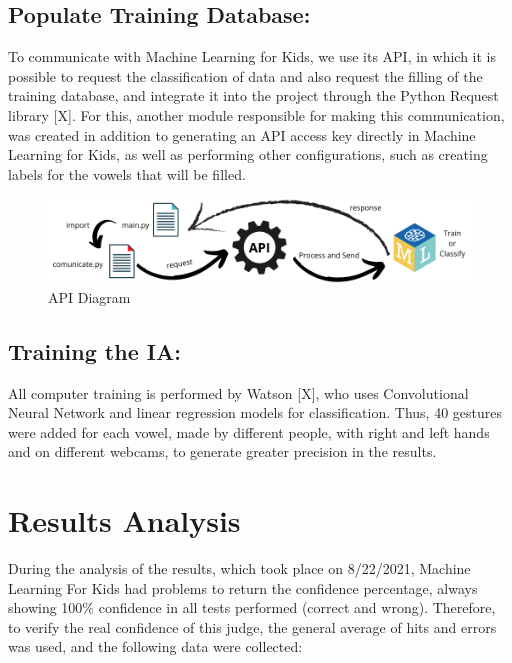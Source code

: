 \documentclass[a4paper, 12pt]{article}
\begin{document}
\subsection{Populate Training Database:}
To communicate with Machine Learning for Kids, we use its API, in which it is possible to request the classification of data and also request the filling of the training database, and integrate it into the project through the Python Request library [X]. For this, another module responsible for making this communication, was created in addition to generating an API access key directly in Machine Learning for Kids, as well as performing other configurations, such as creating labels for the vowels that will be filled.

 \begin{figure}[!ht]
\centering
\includegraphics[scale=0.5]{img/api_diagram.png}
\caption{API Diagram}
\label{figure_5}
\end{figure}





\subsection{Training the IA:}
All computer training is performed by Watson [X], who uses Convolutional Neural Network and linear regression models for classification. Thus, 40 gestures were added for each vowel, made by different people, with right and left hands and on different webcams, to generate greater precision in the results.



\section{Results Analysis}



During the analysis of the results, which took place on 8/22/2021, Machine Learning For Kids had problems to return the confidence percentage, always showing 100\% confidence in all tests performed (correct and wrong). Therefore, to verify the real confidence of this judge, the general average of hits and errors was used, and the following data were collected:
\end{document}
